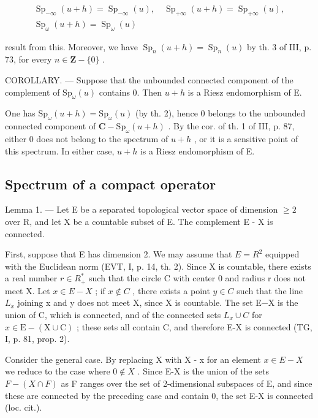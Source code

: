 \[
\begin{array}{c} \operatorname{Sp} _ {- \infty} (u + h) = \operatorname{Sp} _ {- \infty} (u), \quad \operatorname{Sp} _ {+ \infty} (u + h) = \operatorname{Sp} _ {+ \infty} (u), \\ \operatorname{Sp} _ {\omega} (u + h) = \operatorname{Sp} _ {\omega} (u) \end{array}
\]

result from this. Moreover, we have \(\operatorname{Sp}_{n}(u+h)=\operatorname{Sp}_{n}(u)\) by th. 3 of III, p. 73, for every \(n\in \mathbf{Z}-\{0\}\) .

COROLLARY. --- Suppose that the unbounded connected component of the complement of \(\mathrm{Sp}_{\omega}(u)\) contains 0. Then \(u + h\) is a Riesz endomorphism of E.

One has \(\mathrm{Sp}_{\omega}(u+h)=\mathrm{Sp}_{\omega}(u)\) (by th. 2), hence 0 belongs to the unbounded connected component of \(\mathbf{C}-\mathrm{Sp}_{\omega}(u+h)\) . By the cor. of th. 1 of III, p. 87, either 0 does not belong to the spectrum of \(u+h\) , or it is a sensitive point of this spectrum. In either case, \(u+h\) is a Riesz endomorphism of E.

\subsection{Spectrum of a compact operator}

Lemma 1. --- Let E be a separated topological vector space of dimension \(\geqslant 2\) over R, and let X be a countable subset of E. The complement E - X is connected.

First, suppose that E has dimension 2. We may assume that \(E = R^{2}\) equipped with the Euclidean norm (EVT, I, p. 14, th. 2). Since X is countable, there exists a real number \(r \in R_{+}^{*}\) such that the circle C with center 0 and radius r does not meet X. Let \(x \in E - X\) ; if \(x \notin C\) , there exists a point \(y \in C\) such that the line \(L_{x}\) joining x and y does not meet X, since X is countable. The set E−X is the union of C, which is connected, and of the connected sets \(L_{x} \cup C\) for \(x \in \mathrm{E} - (\mathrm{X} \cup \mathrm{C})\) ; these sets all contain C, and therefore E-X is connected (TG, I, p. 81, prop. 2).

Consider the general case. By replacing X with X - x for an element \(x \in E - X\) we reduce to the case where \(0 \notin X\) . Since E-X is the union of the sets \(F - (X \cap F)\) as F ranges over the set of 2-dimensional subspaces of E, and since these are connected by the preceding case and contain 0, the set E-X is connected (loc. cit.).

